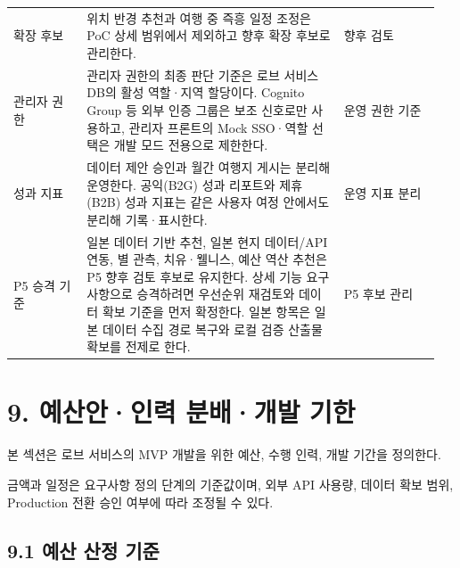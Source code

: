 \documentclass[12pt,a4paper]{article}
\newcommand{\DocNeedspace}[1]{\par\ifdim\dimexpr\pagegoal-\pagetotal\relax<#1\newpage\fi}
\begin{document}
\begin{small}
\begin{longtable}{@{}>{\RaggedRight\arraybackslash}m{0.160\linewidth}>{\RaggedRight\arraybackslash}m{0.568\linewidth}>{\RaggedRight\arraybackslash}m{0.219\linewidth}@{}}
확장 후보 & 위치 반경 추천과 여행 중 즉흥 일정 조정은 PoC 상세 범위에서 제외하고 향후 확장 후보로 관리한다. & 향후 검토 \\
관리자 권한 & 관리자 권한의 최종 판단 기준은 로브 서비스 DB의 활성 역할·지역 할당이다. Cognito Group 등 외부 인증 그룹은 보조 신호로만 사용하고, 관리자 프론트의 Mock SSO·역할 선택은 개발 모드 전용으로 제한한다. & 운영 권한 기준 \\
성과 지표 & 데이터 제안 승인과 월간 여행지 게시는 분리해 운영한다. 공익(B2G) 성과 리포트와 제휴(B2B) 성과 지표는 같은 사용자 여정 안에서도 분리해 기록·표시한다. & 운영 지표 분리 \\
P5 승격 기준 & 일본 데이터 기반 추천, 일본 현지 데이터/API 연동, 별 관측, 치유·웰니스, 예산 역산 추천은 P5 향후 검토 후보로 유지한다. 상세 기능 요구사항으로 승격하려면 우선순위 재검토와 데이터 확보 기준을 먼저 확정한다. 일본 항목은 일본 데이터 수집 경로 복구와 로컬 검증 산출물 확보를 전제로 한다. & P5 후보 관리 \\
\bottomrule
\end{longtable}
\end{small}


\newpage

\DocNeedspace{10\baselineskip}
\section*{9. 예산안·인력 분배·개발 기한}


\DocNeedspace{3\baselineskip}
본 섹션은 로브 서비스의 MVP 개발을 위한 예산, 수행 인력, 개발 기간을 정의한다.

\DocNeedspace{3\baselineskip}
금액과 일정은 요구사항 정의 단계의 기준값이며, 외부 API 사용량, 데이터 확보 범위, Production 전환 승인 여부에 따라 조정될 수 있다.


\DocNeedspace{24\baselineskip}
\subsection*{9.1 예산 산정 기준}
\end{document}
